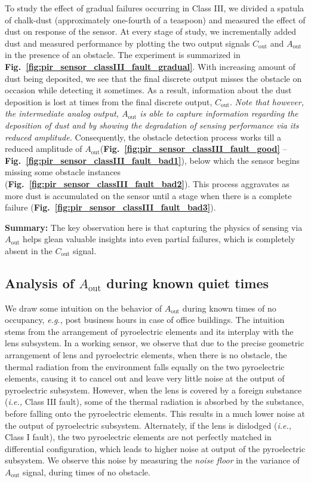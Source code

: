 \documentclass[manuscript]{acmart}
\newcommand{\eg}{{\it e.g.,}\xspace}
\newcommand{\ie}{{\it i.e.,}\xspace}
\newcommand{\cout}{$C_{\text{out}}$\xspace}
\newcommand{\aout}{$A_{\text{out}}$\xspace}
\begin{document}
To study the effect of gradual failures occurring in Class III, we divided a spatula of chalk-dust (approximately one-fourth of a teaspoon) and measured the effect of dust on response of the sensor. At every stage of study, we incrementally added dust and measured performance by plotting the two output signals \cout and \aout in the presence of an obstacle. The experiment is summarized in {\bfseries Fig.~\ref{fig:pir_sensor_classIII_fault_gradual}}. With increasing amount of dust being deposited, we see that the final discrete output misses the obstacle on occasion while detecting it sometimes. As a result, information about the dust deposition is lost at times from the final discrete output, \cout. \textit{Note that however, the intermediate analog output, \aout is able to capture information regarding the deposition of dust and by showing the degradation of sensing performance via its reduced amplitude.} Consequently, the obstacle detection process works till a reduced amplitude of \aout ({\bfseries Fig.~\ref{fig:pir_sensor_classIII_fault_good}} -- {\bfseries Fig.~\ref{fig:pir_sensor_classIII_fault_bad1}}), below which the sensor begins missing some obstacle instances ({\bfseries Fig.~\ref{fig:pir_sensor_classIII_fault_bad2}}). This process aggravates as more dust is accumulated on the sensor until a stage when there is a complete failure ({\bfseries Fig.~\ref{fig:pir_sensor_classIII_fault_bad3}}).

\noindent \textbf{Summary:} The key observation here is that capturing the physics of sensing via \aout helps glean valuable insights into even partial failures, which is completely absent in the \cout signal.


\subsection{Analysis of \aout during known quiet times} \label{subsec:aout_quiet_times} We draw some intuition on the behavior of \aout during known times of no occupancy, \eg post business hours in case of office buildings. The intuition stems from the arrangement of pyroelectric elements and its interplay with the lens subsystem. In a working sensor, we observe that due to the precise geometric arrangement of lens and pyroelectric elements, when there is no obstacle, the thermal radiation from the environment falls equally on the two pyroelectric elements, causing it to cancel out and leave very little noise at the output of pyroelectric subsystem. However, when the lens is covered by a foreign substance (\ie Class III fault), some of the thermal radiation is absorbed by the substance, before falling onto the pyroelectric elements. This results in a much lower noise at the output of pyroelectric subsystem. Alternately, if the lens is dislodged (\ie Class I fault), the two pyroelectric elements are not perfectly matched in differential configuration, which leads to higher noise at output of the pyroelectric subsystem. We observe this noise by measuring the \textit{noise floor} in the variance of \aout signal, during times of no obstacle.
\end{document}
